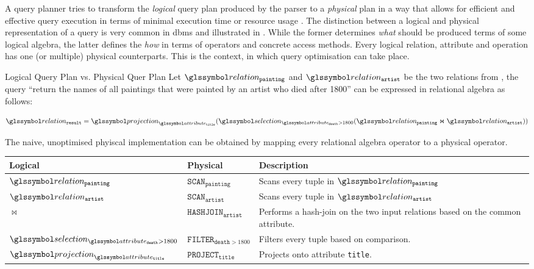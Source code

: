A query planner tries to transform the \emph{logical} query plan produced by the parser to a \emph{physical} plan in a way that allows for efficient and effective query execution in terms of minimal execution time or resource usage \cite{Jarke:1984Query,Garcia:2009Database}. The distinction between a logical and physical representation of a query is very common in \acrshort{dbms} and illustrated in . While the former determines \emph{what} should be produced terms of some logical algebra, the latter defines the \emph{how} in terms of operators and concrete access methods. Every logical relation, attribute and operation has one (or multiple) physical counterparts. This is the context, in which query optimisation can take place.

\begin{example}[label=example:logical_vs_physical]{Logical Query Plan vs. Physical Quer Plan}{}
    Let  $\relation_{\mathtt{painting}}$ and $\relation_{\mathtt{artist}}$ be the two relations from , the query ``return the names of all paintings that were painted by an artist who died after 1800'' can be expressed in relational algebra as follows:

    \begin{equation*}
        \relation_{\mathtt{result}} = \projection_{\attribute_{\mathtt{title}}} (\selection_{\attribute_{\mathtt{death}} > 1800}(\relation_{\mathtt{painting}} \Join \relation_{\mathtt{artist}}))
    \end{equation*}

    The naive, unoptimised phyiscal implementation can be obtained by mapping every relational algebra operator to a physical operator.

    \begin{center}
        \begin{tabular}{| l | l | p{8cm} |}
            \hline
            \textbf{Logical} & \textbf{Physical} & \textbf{Description} \\ 
            \hline
            \hline
            $\relation_{\mathtt{painting}}$ & $\mathtt{SCAN}_{\mathtt{painting}}$ & Scans every tuple in $\relation_{\mathtt{painting}}$ \\
            \hline
            $\relation_{\mathtt{artist}}$ & $\mathtt{SCAN}_{\mathtt{artist}}$ & Scans every tuple in $\relation_{\mathtt{artist}}$ \\
            \hline
            $\Join$ & $\mathtt{HASHJOIN}_{\mathtt{artist}}$ & Performs a hash-join on the two input relations based on the common attribute. \\
            \hline
            $\selection_{\attribute_{\mathtt{death}} > 1800}$ & $\mathtt{FILTER}_{\mathtt{death} > 1800}$ & Filters every tuple based on comparison. \\ \hline
            $\projection_{\attribute_{\mathtt{title}}}$ & $\mathtt{PROJECT}_{\mathtt{title}}$ & Projects onto attribute \texttt{title}. \\
            \hline
        \end{tabular}
    \end{center}
\end{example}

